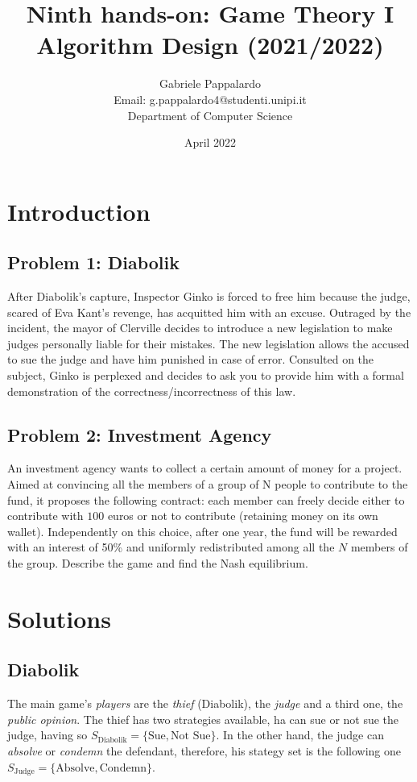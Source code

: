 \documentclass{article}
\title{Ninth hands-on: Game Theory I\\[1ex] \large Algorithm Design (2021/2022)}
\author{Gabriele Pappalardo\\Email: g.pappalardo4@studenti.unipi.it\\Department of Computer Science}
\date{April 2022}
\begin{document}
\maketitle

\section{Introduction}

\subsection{Problem 1: Diabolik}

After Diabolik's capture, Inspector Ginko is forced to free him because the judge, scared of Eva Kant's revenge, has acquitted him with an excuse. 
Outraged by the incident, the mayor of Clerville decides to introduce a new legislation to make judges personally liable for their mistakes. 
The new legislation allows the accused to sue the judge and have him punished in case of error. Consulted on the subject, 
Ginko is perplexed and decides to ask you to provide him with a formal demonstration of the correctness/incorrectness of this law. 


\subsection{Problem 2: Investment Agency}

An investment agency wants to collect a certain amount of money for a project. Aimed at convincing all the members of a group of N people 
to contribute to the fund, it proposes the following contract: each member can freely decide either to contribute with $100$ euros or not 
to contribute (retaining money on its own wallet). Independently on this choice, after one year, the fund will be rewarded with an interest of 50\% 
and uniformly redistributed among all the $N$ members of the group. Describe the game and find the Nash equilibrium. 

\section{Solutions}

\subsection{Diabolik}

The main game's \textit{players} are the \textit{thief} (Diabolik), the \textit{judge} and a third one, the \textit{public opinion}. The thief has two strategies available,
ha can sue or not sue the judge, having so $S_{\textrm{Diabolik}} = \{\textrm{Sue}, \textrm{Not Sue}\}$. In the other hand, the judge can \textit{absolve} or \textit{condemn} the defendant, therefore, his
stategy set is the following one  $S_{\textrm{Judge}} = \{\textrm{Absolve}, \textrm{Condemn}\}$.\\
\end{document}
